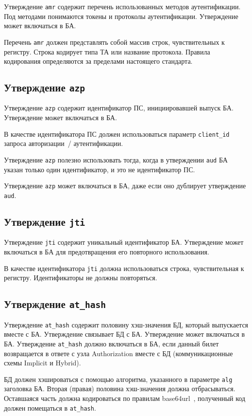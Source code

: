 Утверждение \lstinline{amr} содержит перечень использованных методов
аутентификации. Под методами понимаются токены и протоколы аутентификации.
%
Утверждение может включаться в БА.

Перечень \lstinline{amr} должен представлять собой массив строк,
чувствительных к регистру. Строка кодирует типа ТА или название протокола.
%
Правила кодирования определяются за пределами настоящего стандарта.

\subsection{Утверждение \lstinline{azp}}\label{CLAIMS.Azp}

Утверждение \lstinline{azp} содержит идентификатор ПС, инициировавшей выпуск 
БА. Утверждение может включаться в БА.

В качестве идентификатора ПС должен использоваться параметр 
\lstinline{client_id} запроса авторизации~/ аутентификации.

Утверждение \lstinline{azp} полезно использовать тогда, когда 
в утверждении \lstinline{aud} БА указан только один идентификатор,
и это не идентификатор ПС.

Утверждение \lstinline{azp} может включаться в БА, даже если оно дублирует 
утверждение \lstinline{aud}.


\subsection{Утверждение \lstinline{jti}}\label{CLAIMS.Jti}

Утверждение \lstinline{jti} содержит уникальный идентификатор БА.
Утверждение может включаться в БА для предотвращения его повторного использования.

В качестве идентификатора \lstinline{jti} должна использоваться строка, 
чувствительная к регистру. Идентификаторы не должны повторяться.

\subsection{Утверждение \lstinline{at_hash}}\label{CLAIMS.AtHash}

Утверждение \lstinline{at_hash} содержит половину хэш-значения БД, который 
выпускается вместе с БА. Утверждение связывает БД с БА. Утверждение может 
включаться в БА.
%
Утверждение \lstinline{at_hash} должно включаться в БА, если данный билет 
возвращается в ответе с узла Authorization вместе с БД (коммуникационные 
схемы Implicit и Hybrid).

БД должен хэшироваться с помощью алгоритма, указанного в параметре
\lstinline{alg} заголовка БА. Вторая (правая) половина хэш-значения 
должна отбрасываться. Оставшаяся часть должна кодироваться по правилам 
base64url~\cite{RFC4648}, полученный код должен помещаться в 
\lstinline{at_hash}.

